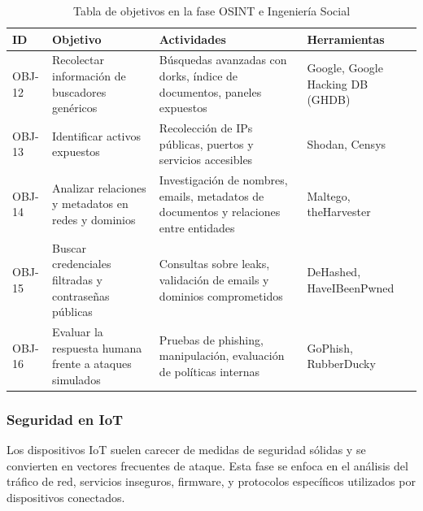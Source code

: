 \documentclass[a4paper, 11pt]{article}
\begin{document}
\begin{table}[H]
\centering
\renewcommand{\arraystretch}{1.4}
    \begin{tabular}{|p{1.4cm}|p{3.9cm}|p{5.3cm}|p{4.2cm}|}
\hline
\textbf{ID} & \textbf{Objetivo} & \textbf{Actividades} & \textbf{Herramientas}  \\
\hline
OBJ-12 & Recolectar información de buscadores genéricos & Búsquedas avanzadas con dorks, índice de documentos, paneles expuestos & Google, Google Hacking DB (GHDB)  \\
\hline
OBJ-13 & Identificar activos expuestos & Recolección de IPs públicas, puertos y servicios accesibles & Shodan, Censys  \\
\hline
OBJ-14 & Analizar relaciones y metadatos en redes y dominios & Investigación de nombres, emails, metadatos de documentos y relaciones entre entidades & Maltego, theHarvester \\
\hline
OBJ-15 & Buscar credenciales filtradas y contraseñas públicas & Consultas sobre leaks, validación de emails y dominios comprometidos & DeHashed, HaveIBeenPwned  \\
\hline
OBJ-16 & Evaluar la respuesta humana frente a ataques simulados & Pruebas de phishing, manipulación, evaluación de políticas internas  & GoPhish, RubberDucky \\
\hline
\end{tabular}
\caption{Tabla de objetivos en la fase OSINT e Ingeniería Social}
\end{table}



\par\vspace{0.5cm}




\subsubsection{Seguridad en IoT}

Los dispositivos IoT suelen carecer de medidas de seguridad sólidas y se convierten en vectores frecuentes de ataque. Esta fase se enfoca en el análisis del tráfico de red, servicios inseguros, firmware, y protocolos específicos utilizados por dispositivos conectados.
\end{document}
